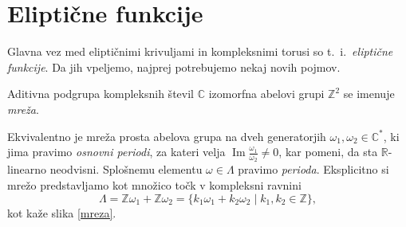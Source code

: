 \documentclass[mat1]{fmfdelo}
\numberwithin{equation}{section}
\newcommand{\R}{\mathbb R}
\newcommand{\Z}{\mathbb Z}
\newcommand{\C}{\mathbb C}
\newcommand{\CM}{\mathbb C ^*}
\newcommand{\om}{\omega}
\renewcommand\Im{\operatorname{Im}}%
\theoremstyle{definition}
\begin{document}

\section{Eliptične funkcije} \label{elipticne funkcije}

Glavna vez med eliptičnimi krivuljami in kompleksnimi torusi so t.~i.\ \emph{eliptične funkcije}. Da jih vpeljemo, najprej potrebujemo nekaj novih pojmov.

\begin{definicija}
    Aditivna podgrupa kompleksnih števil $\C$ izomorfna abelovi grupi $\Z^2$ se imenuje \emph{mreža}. 
\end{definicija}
    
Ekvivalentno je mreža prosta abelova grupa na dveh generatorjih $\omega_1, \omega_2 \in \CM$, ki jima pravimo \emph{osnovni periodi}, za kateri velja $\Im \frac{\omega_1}{\omega_2} \neq 0$, kar pomeni, da sta $\R$-linearno neodvisni. Splošnemu elementu $\omega \in \Lambda$ pravimo \emph{perioda}. Eksplicitno si mrežo predstavljamo kot množico točk v kompleksni ravnini
\[
    \Lambda = \Z\om_1 + \Z\om_2 = \{k_1 \omega_1 + k_2 \omega_2 \mid k_1, k_2 \in \Z\},  
\]
kot kaže slika \ref{mreza}.
\\
\end{document}
